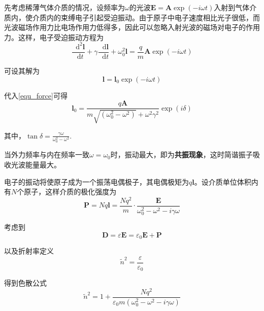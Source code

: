 \documentclass[UTF8]{ctexart}
\newcommand*{\dif}{\mathop{}\!\mathrm{d}}
\begin{document}
	先考虑稀薄气体介质的情况，设频率为$ \omega $的光波$ \boldsymbol{E} = \boldsymbol{A} \exp (- i \omega t) $入射到气体介质内，使介质内的束缚电子引起受迫振动。由于原子中电子速度相比光子很低，而光波磁场作用力比电场作用力低得多，因此可以忽略入射光波的磁场对电子的作用力。这样，电子受迫振动方程为
	\begin{equation}
	\frac{\dif^{2} \boldsymbol{l}}{\dif t} + \gamma \frac{\dif \boldsymbol{l}}{\dif t} + \omega_{0}^{2} \boldsymbol{l} = \frac{q}{m} \boldsymbol{A} \exp (-i \omega t) \label{equ_force}
	\end{equation}
	
	可设其解为
	\begin{equation}
	\boldsymbol{l}= \boldsymbol{l}_{0} \exp (-i \omega t)
	\end{equation}
	
	\noindent 代入\ref{equ_force}可得
	\begin{equation}
	\boldsymbol{l}_{0} = \frac{q \boldsymbol{A}}{m \sqrt{\left(\omega_{0}^{2}-\omega^{2}\right)}+\omega^{2} \gamma^{2}} \exp(i \delta)
\end{equation}

\noindent 其中，$ \tan \delta = \frac{\gamma \omega}{\omega_{0}^{2} - \omega^{2}} $.

	当外力频率与内在频率一致$ \omega = \omega_{0} $时，振动最大，即为\textbf{共振现象}，这时简谐振子吸收光波能量最大。

	电子的振动将使原子成为一个振荡电偶极子，其电偶极矩为$ q \boldsymbol{l} $。设介质单位体积内有$ N $个原子，这样介质的极化强度为
	\begin{equation}
		\boldsymbol{P} = N q \boldsymbol{l} = \frac{N q^{2}}{m} \cdot \frac{\boldsymbol{E}}{\omega_{0}^{2} - \omega^{2} - i \gamma \omega}
	\end{equation}

\noindent 考虑到
\begin{equation}
	\boldsymbol{D} = \varepsilon \boldsymbol{E} = \varepsilon_{0} \boldsymbol{E} + \boldsymbol{P}
\end{equation}

\noindent 以及折射率定义
\begin{equation}
	\tilde{n}^{2} = \frac{\varepsilon}{\varepsilon_{0}}
\end{equation}

\noindent 得到色散公式
\begin{equation}
	\tilde{n}^{2} = 1 + \frac{N q^{2}}{\varepsilon_{0} m \left(\omega_{0}^{2} - \omega^{2} - i \gamma \omega\right)}
\end{equation}
\end{document}
